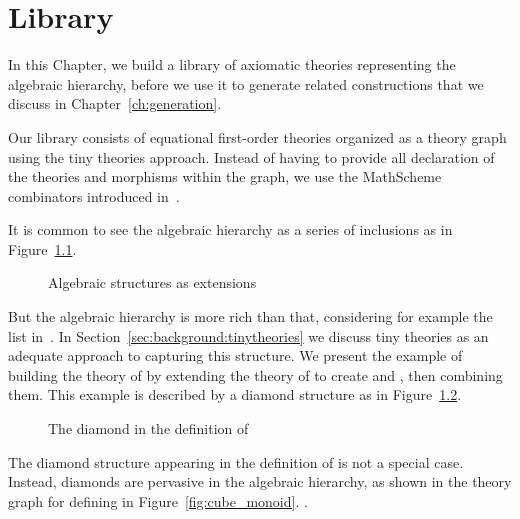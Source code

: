 \chapter{Library}
\label{ch:library}

In this Chapter, we build a library of axiomatic theories representing the algebraic hierarchy, before we use it to generate related constructions that we discuss in Chapter~\ref{ch:generation}. 

Our library consists of equational first-order theories organized as a theory graph using the tiny theories approach. Instead of having to provide all declaration of the theories and morphisms within the graph, we use the MathScheme combinators introduced in~\cite{CaretteOConnorTPC, carette2018building}. 

It is common to see the algebraic hierarchy as a series of inclusions as in Figure~\ref{fig:flatExtensions}. 
\begin{figure}
\caption{Algebraic structures as extensions}
\label{fig:flatExtensions}
\end{figure}  
But the algebraic hierarchy is more rich than that, considering for example the list in~\cite{jipsen}. 
In Section~\ref{sec:background:tinytheories} we discuss tiny theories as an adequate approach to capturing this structure. We present the example of building the theory of  by extending the theory of  to create  and , then combining them. This example is described by a diamond structure as in Figure~\ref{fig:unitalDiamond}. 
\begin{figure}
\caption{The diamond in the definition of }
\label{fig:unitalDiamond}
\end{figure}
The diamond structure appearing in the definition of  is not a special case. Instead, diamonds are pervasive in the algebraic hierarchy, as shown in the theory graph for defining  in Figure~\ref{fig:cube_monoid}. 
.

